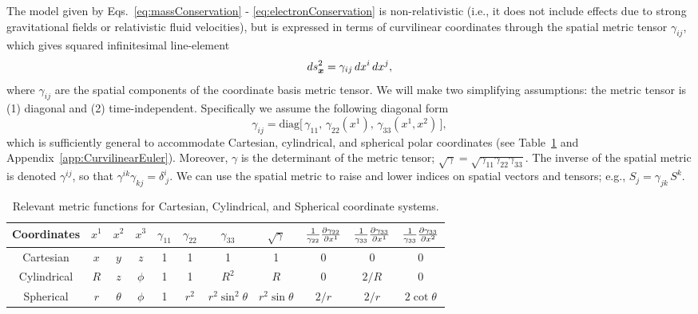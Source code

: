 \documentclass[10pt,preprint]{aastex}
\begin{document}
The model given by Eqs.~\eqref{eq:massConservation} - \eqref{eq:electronConservation} is non-relativistic (i.e., it does not include effects due to strong gravitational fields or relativistic fluid velocities), but is expressed in terms of curvilinear coordinates through the spatial metric tensor $\gamma_{ij}$, which gives squared infinitesimal line-element
\begin{equation}
  ds_{\boldsymbol{x}}^{2}=\gamma_{ij}\,dx^{i}\,dx^{j},
\end{equation}
where $\gamma_{ij}$ are the spatial components of the coordinate basis metric tensor.  
We will make two simplifying assumptions: the metric tensor is (1) diagonal and (2) time-independent.  
Specifically we assume the following diagonal form
\begin{equation}
  \gamma_{ij}
  =\mbox{diag}\big[\,\gamma_{11},\,\gamma_{22}(x^{1}),\,\gamma_{33}(x^{1},x^{2})\,\big], 
  \label{eq:threeMetric}
\end{equation}
which is sufficiently general to accommodate Cartesian, cylindrical, and spherical polar coordinates (see Table~\ref{tab:metricFunctions} and Appendix~\ref{app:CurvilinearEuler}).  
Moreover, $\gamma$ is the determinant of the metric tensor; $\sqrt{\gamma}=\sqrt{\gamma_{11}\gamma_{22}\gamma_{33}}$.  
The inverse of the spatial metric is denoted $\gamma^{ij}$, so that $\gamma^{ik}\gamma_{kj}=\delta^{i}_{~j}$.  
We can use the spatial metric to raise and lower indices on spatial vectors and tensors; e.g., $S_{j}=\gamma_{jk}\,S^{k}$.  

\begin{table}
  \begin{center}
  \caption{Relevant metric functions for Cartesian, Cylindrical, and Spherical coordinate systems.\label{tab:metricFunctions}}
  \begin{tabular}{ccccccccccc}
    \midrule
    Coordinates & $x^{1}$ & $x^{2}$ & $x^{3}$ & $\gamma_{11}$ & $\gamma_{22}$ & $\gamma_{33}$ & $\sqrt{\gamma}$
    & $\frac{1}{\gamma_{22}}\frac{\partial \gamma_{22}}{\partial x^{1}}$ & $\frac{1}{\gamma_{33}}\frac{\partial \gamma_{33}}{\partial x^{1}}$ & $\frac{1}{\gamma_{33}}\frac{\partial \gamma_{33}}{\partial x^{2}}$ \\
    \midrule
    \midrule
    Cartesian  & $x$ & $y$ & $z$ & 1 & 1 & 1 & 1 & 0 & 0 & 0 \\
    Cylindrical & $R$ & $z$ & $\phi$ & 1 & 1 & $R^{2}$ & $R$ & 0 & $2/R$ & 0 \\
    Spherical   & $r$ & $\theta$ & $\phi$ & 1 & $r^{2}$ & $r^{2}\sin^{2}\theta$ & $r^{2}\sin\theta$ & $2/r$ & $2/r$ & $2\cot\theta$ \\
    \midrule
    \midrule
  \end{tabular}
  \end{center}
\end{table}
\end{document}
